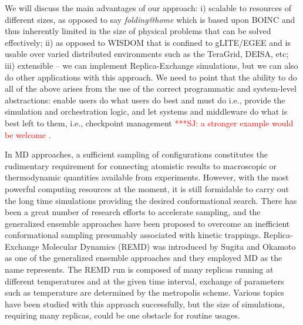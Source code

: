 \documentclass[times, 10pt, twocolumn]{article}
\newcommand{\jhanote}[1]{ {\textcolor{red} { ***SJ: #1 }}}
\newcommand{\jhanote}[1]{}
\begin{document}
We will discuss the main advantages of our approach: i) scalable to
resources of different sizes, as opposed to say {\it folding@home}
which is based upon BOINC and thus inherently limited in the size of
physical problems that can be solved effectively; ii) as opposed to
WISDOM that is confined to gLITE/EGEE and is usable over varied
distributed environments such as the TeraGrid, DEISA, etc; iii)
extensible -- we can implement Replica-Exchange simulations, but we
can also do other applications with this approach. We need to point
that the ability to do all of the above arises from the use of the
correct programmatic and system-level abstractions: enable users do
what users do best and must do i.e., provide the simulation and
orchestration logic, and let systems and middleware do what is best
left to them, i.e., checkpoint management \jhanote{a stronger example
  would be welcome}.





In MD approaches, a sufficient sampling of configurations constitutes
the rudimentary requirement for connecting atomistic results to
macroscopic or thermodynamic quantities available from experiments.
However, with the most powerful computing resources at the moment, it
is still formidable to carry out the long time simulations providing
the desired conformational search.  There has been a great number of
research efforts to accelerate sampling, and the generalized ensemble
approaches have been proposed to overcome an inefficient
conformational sampling presumably associated with kinetic trappings.
Replica-Exchange Molecular Dynamics (REMD) was introduced by Sugita
and Okamoto as one of the generalized ensemble approaches and they
employed MD as the name represents.  The REMD run is composed of many
replicas running at different temperatures and at the given time
interval, exchange of parameters such as temperature are determined by
the metropolis scheme.  Various topics have been studied with this
approach successfully, but the size of simulations, requiring many
replicas, could be one obstacle for routine usages.
\end{document}
